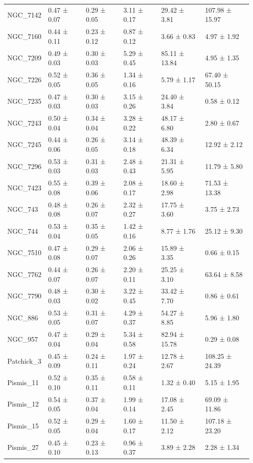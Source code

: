 \begin{tabular}{llllll}
NGC_7142 & 0.47 ± 0.07 & 0.29 ± 0.05 & 3.11 ± 0.17 & 29.42 ± 3.81 & 107.98 ± 15.97 \\
NGC_7160 & 0.44 ± 0.11 & 0.23 ± 0.12 & 0.87 ± 0.12 & 3.66 ± 0.83 & 4.97 ± 1.92 \\
NGC_7209 & 0.49 ± 0.03 & 0.30 ± 0.03 & 5.29 ± 0.45 & 85.11 ± 13.84 & 4.95 ± 1.35 \\
NGC_7226 & 0.52 ± 0.05 & 0.36 ± 0.05 & 1.34 ± 0.16 & 5.79 ± 1.17 & 67.40 ± 50.15 \\
NGC_7235 & 0.47 ± 0.03 & 0.30 ± 0.03 & 3.15 ± 0.26 & 24.40 ± 3.84 & 0.58 ± 0.12 \\
NGC_7243 & 0.50 ± 0.04 & 0.34 ± 0.04 & 3.28 ± 0.22 & 48.17 ± 6.80 & 2.80 ± 0.67 \\
NGC_7245 & 0.44 ± 0.06 & 0.26 ± 0.05 & 3.14 ± 0.18 & 48.39 ± 6.34 & 12.92 ± 2.12 \\
NGC_7296 & 0.53 ± 0.03 & 0.31 ± 0.03 & 2.48 ± 0.43 & 21.31 ± 5.95 & 11.79 ± 5.80 \\
NGC_7423 & 0.55 ± 0.08 & 0.39 ± 0.06 & 2.08 ± 0.17 & 18.60 ± 2.98 & 71.53 ± 13.38 \\
NGC_743 & 0.48 ± 0.08 & 0.26 ± 0.07 & 2.32 ± 0.27 & 17.75 ± 3.60 & 3.75 ± 2.73 \\
NGC_744 & 0.53 ± 0.04 & 0.35 ± 0.05 & 1.42 ± 0.16 & 8.77 ± 1.76 & 25.12 ± 9.30 \\
NGC_7510 & 0.47 ± 0.08 & 0.29 ± 0.07 & 2.06 ± 0.26 & 15.89 ± 3.35 & 0.66 ± 0.15 \\
NGC_7762 & 0.44 ± 0.07 & 0.26 ± 0.07 & 2.20 ± 0.11 & 25.25 ± 3.10 & 63.64 ± 8.58 \\
NGC_7790 & 0.48 ± 0.03 & 0.30 ± 0.02 & 3.22 ± 0.45 & 33.42 ± 7.70 & 0.86 ± 0.61 \\
NGC_886 & 0.53 ± 0.05 & 0.31 ± 0.07 & 4.29 ± 0.37 & 54.27 ± 8.85 & 5.96 ± 1.80 \\
NGC_957 & 0.47 ± 0.04 & 0.29 ± 0.04 & 5.34 ± 0.58 & 82.94 ± 15.78 & 0.29 ± 0.08 \\
Patchick_3 & 0.45 ± 0.09 & 0.24 ± 0.11 & 1.97 ± 0.24 & 12.78 ± 2.67 & 108.25 ± 24.39 \\
Pismis_11 & 0.52 ± 0.10 & 0.35 ± 0.11 & 0.58 ± 0.11 & 1.32 ± 0.40 & 5.15 ± 1.95 \\
Pismis_12 & 0.54 ± 0.05 & 0.37 ± 0.04 & 1.99 ± 0.14 & 17.08 ± 2.45 & 69.09 ± 11.86 \\
Pismis_15 & 0.52 ± 0.05 & 0.29 ± 0.04 & 1.60 ± 0.17 & 11.50 ± 2.12 & 107.18 ± 23.20 \\
Pismis_27 & 0.45 ± 0.10 & 0.23 ± 0.13 & 0.96 ± 0.37 & 3.89 ± 2.28 & 2.28 ± 1.34 \\

\end{tabular}
